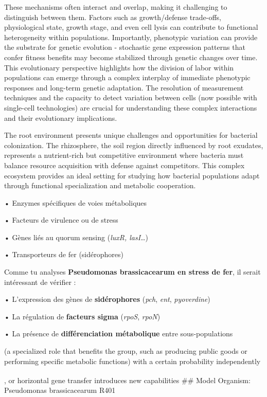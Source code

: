 \documentclass[
  11pt,
  a4paper,
]{report}
\begin{document}
These mechanisms often interact and overlap, making it challenging to
distinguish between them. Factors such as growth/defense trade-offs,
physiological state, growth stage, and even cell lysis can contribute to
functional heterogeneity within populations. Importantly, phenotypic
variation can provide the substrate for genetic evolution - stochastic
gene expression patterns that confer fitness benefits may become
stabilized through genetic changes over time. This evolutionary
perspective highlights how the division of labor within populations can
emerge through a complex interplay of immediate phenotypic responses and
long-term genetic adaptation. The resolution of measurement techniques
and the capacity to detect variation between cells (now possible with
single-cell technologies) are crucial for understanding these complex
interactions and their evolutionary implications.

The root environment presents unique challenges and opportunities for
bacterial colonization. The rhizosphere, the soil region directly
influenced by root exudates, represents a nutrient-rich but competitive
environment where bacteria must balance resource acquisition with
defense against competitors. This complex ecosystem provides an ideal
setting for studying how bacterial populations adapt through functional
specialization and metabolic cooperation.

• Enzymes spécifiques de voies métaboliques

• Facteurs de virulence ou de stress

• Gènes liés au quorum sensing (\emph{luxR, lasI}\ldots)

• Transporteurs de fer (sidérophores)

Comme tu analyses \textbf{Pseudomonas brassicacearum en stress de fer},
il serait intéressant de vérifier :

• L'expression des gènes de \textbf{sidérophores} (\emph{pch},
\emph{ent}, \emph{pyoverdine})

• La régulation de \textbf{facteurs sigma} (\emph{rpoS}, \emph{rpoN})

• La présence de \textbf{différenciation métabolique} entre
sous-populations

(a specialized role that benefits the group, such as producing public
goods or performing specific metabolic functions) with a certain
probability independently

, or horizontal gene transfer introduces new
capabilities\textsuperscript{} \#\# Model
Organism: Pseudomonas brassicacearum R401
\end{document}
